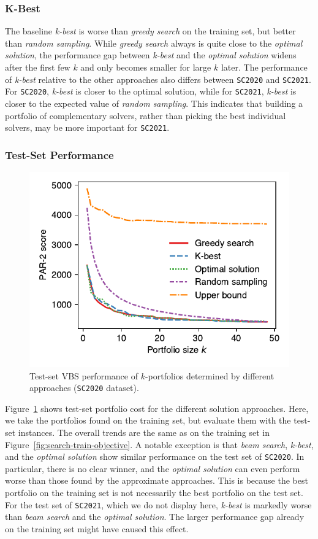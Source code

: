 \documentclass[runningheads]{llncs}
\begin{document}
\subsubsection{K-Best}

The baseline \emph{k-best} is worse than \emph{greedy search} on the training set, but better than \emph{random sampling}.
While \emph{greedy search} always is quite close to the \emph{optimal solution}, the performance gap between \emph{k-best} and the \emph{optimal solution} widens after the first few $k$ and only becomes smaller for large $k$ later.
The performance of \emph{k-best} relative to the other approaches also differs between \texttt{SC2020} and \texttt{SC2021}.
For \texttt{SC2020}, \emph{k-best} is closer to the optimal solution, while for \texttt{SC2021}, \emph{k-best} is closer to the expected value of \emph{random sampling}.
This indicates that building a portfolio of complementary solvers, rather than picking the best individual solvers, may be more important for \texttt{SC2021}. 

\subsubsection{Test-Set Performance}

\begin{figure}[htb]
	\centering
	\includegraphics[width=0.5\columnwidth, trim=0 15 0 10, clip]{plots/search-test-objective-2020.pdf}
	\caption{Test-set VBS performance of $k$-portfolios determined by different approaches (\texttt{SC2020} dataset).}
	\label{fig:search-test-objective-2020}
\end{figure}

Figure~\ref{fig:search-test-objective-2020} shows test-set portfolio cost for the different solution approaches.
Here, we take the portfolios found on the training set, but evaluate them with the test-set instances.
The overall trends are the same as on the training set in Figure~\ref{fig:search-train-objective}.
A notable exception is that \emph{beam search}, \emph{k-best}, and the \emph{optimal solution} show similar performance on the test set of \texttt{SC2020}.
In particular, there is no clear winner, and the \emph{optimal solution} can even perform worse than those found by the approximate approaches. 
This is because the best portfolio on the training set is not necessarily the best portfolio on the test set.
For the test set of \texttt{SC2021}, which we do not display here, \emph{k-best} is markedly worse than \emph{beam search} and the \emph{optimal solution}. 
The larger performance gap already on the training set might have caused this effect.
\end{document}
